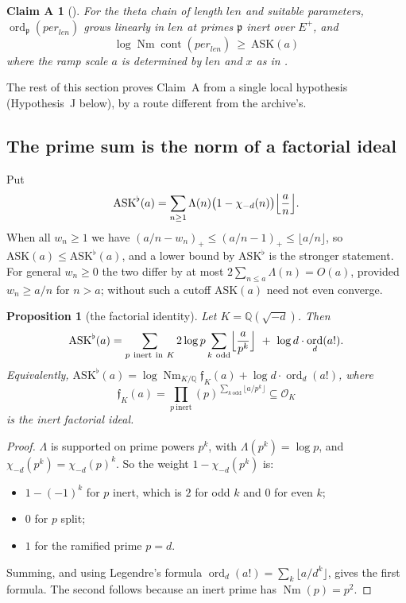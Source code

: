 \documentclass[11pt]{amsart}
\newtheorem{proposition}[theorem]{Proposition}
\newtheorem*{claimA}{Claim A}
\theoremstyle{definition}
\theoremstyle{remark}
\newcommand{\per}{\mathit{per}}
\newcommand{\len}{\mathit{len}}
\DeclareMathOperator{\Nm}{Nm}
\DeclareMathOperator{\ord}{ord}
\DeclareMathOperator{\cont}{cont}
\newcommand{\Q}{\mathbb{Q}}
\newcommand{\pp}{\mathfrak{p}}
\newcommand{\ASK}{\mathrm{ASK}}
\begin{document}
\begin{claimA}[{\cite{Alpoge,Zhang,golf}}]
For the theta chain of length $\len$ and suitable parameters, $\ord_\pp(\per_\len)$ grows linearly in $\len$ at primes $\pp$ inert over $E^+$, and
\[
\log\Nm\cont(\per_\len)\ \ge\ \ASK(a)
\]
where the ramp scale $a$ is determined by $\len$ and $x$ as in \cite{Zhang,golf}.
\end{claimA}

The rest of this section proves Claim~A from a single local hypothesis (Hypothesis~J below), by a route different from the archive's.

\subsection{The prime sum is the norm of a factorial ideal}
Put
\[
\ASK^\flat(a)=\sum_{n\ge1}\Lambda(n)\bigl(1-\chi_{-d}(n)\bigr)\Bigl\lfloor\frac an\Bigr\rfloor .
\]
When all $w_n\ge1$ we have $(a/n-w_n)_+\le(a/n-1)_+\le\lfloor a/n\rfloor$, so $\ASK(a)\le\ASK^\flat(a)$, and a lower bound by $\ASK^\flat$ is the stronger statement. For general $w_n\ge0$ the two differ by at most $2\sum_{n\le a}\Lambda(n)=O(a)$, provided $w_n\ge a/n$ for $n>a$; without such a cutoff $\ASK(a)$ need not even converge.

\begin{proposition}[the factorial identity]\label{prop:factorial}
Let $K=\Q(\sqrt{-d})$. Then
\[
\ASK^\flat(a)=\sum_{p\ \mathrm{inert\ in}\ K}2\log p\sum_{k\ \mathrm{odd}}\Bigl\lfloor\frac a{p^k}\Bigr\rfloor\ +\ \log d\cdot\ord_d(a!).
\]
Equivalently, $\ASK^\flat(a)=\log\Nm_{K/\Q}\mathfrak f_K(a)+\log d\cdot\ord_d(a!)$, where
\[
\mathfrak f_K(a)=\prod_{p\ \mathrm{inert}}(p)^{\sum_{k\ \mathrm{odd}}\lfloor a/p^k\rfloor}\subseteq\mathcal O_K
\]
is the \emph{inert factorial ideal}.
\end{proposition}

\begin{proof}
$\Lambda$ is supported on prime powers $p^k$, with $\Lambda(p^k)=\log p$, and $\chi_{-d}(p^k)=\chi_{-d}(p)^k$. So the weight $1-\chi_{-d}(p^k)$ is:
\begin{itemize}
\item $1-(-1)^k$ for $p$ inert, which is $2$ for odd $k$ and $0$ for even $k$;
\item $0$ for $p$ split;
\item $1$ for the ramified prime $p=d$.
\end{itemize}
Summing, and using Legendre's formula $\ord_d(a!)=\sum_k\lfloor a/d^k\rfloor$, gives the first formula. The second follows because an inert prime has $\Nm(p)=p^2$.
\end{proof}
\end{document}
